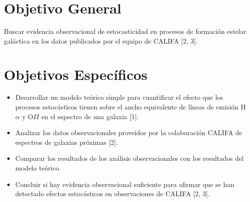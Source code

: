 \documentclass[12pt]{article}
\begin{document}






\section{Objetivo General}

Buscar evidencia observacional de estocasticidad en procesos de
formaci\'on estelar gal\'actica en los datos publicados por el equipo de CALIFA [2, 3].




\section{Objetivos Espec\'ificos}


\begin{itemize}
	\item Desarrollar un modelo te\'orico simple para cuantificar el efecto que los procesos estoc\'asticos
          tienen sobre el ancho equivalente de l\'ineas de emisi\'on
          H$\alpha$ y O$II$ en el espectro de una galaxia [1].
	\item Analizar los datos observacionales prove\'idos por la
          colaboraci\'on CALIFA de espectros de galaxias pr\'oximas [2].
	\item Comparar los resultados de los an\'alisis
          observacionales con los resultados del modelo te\'orico.
  \item Concluir si hay evidencia observacional suficiente para
          afirmar que se han detectado efectos estoc\'asticos en
          observaciones de CALIFA [2, 3].
\end{itemize}
\end{document}
